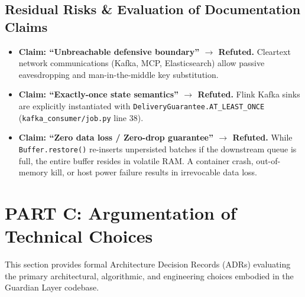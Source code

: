 \documentclass[10pt,a4paper]{report}
\begin{document}
\section{Residual Risks \& Evaluation of Documentation Claims}
\begin{itemize}[leftmargin=*]
  \item \textbf{Claim: ``Unbreachable defensive boundary'' $\rightarrow$ Refuted.} Cleartext network communications (Kafka, MCP, Elasticsearch) allow passive eavesdropping and man-in-the-middle key substitution.
  \item \textbf{Claim: ``Exactly-once state semantics'' $\rightarrow$ Refuted.} Flink Kafka sinks are explicitly instantiated with \texttt{DeliveryGuarantee.AT\_LEAST\_ONCE} (\texttt{kafka\_consumer/job.py} line 38).
  \item \textbf{Claim: ``Zero data loss / Zero-drop guarantee'' $\rightarrow$ Refuted.} While \texttt{Buffer.restore()} re-inserts unpersisted batches if the downstream queue is full, the entire buffer resides in volatile RAM. A container crash, out-of-memory kill, or host power failure results in irrevocable data loss.
\end{itemize}

\chapter{PART C: Argumentation of Technical Choices}

This section provides formal Architecture Decision Records (ADRs) evaluating the primary architectural, algorithmic, and engineering choices embodied in the Guardian Layer codebase.
\end{document}
